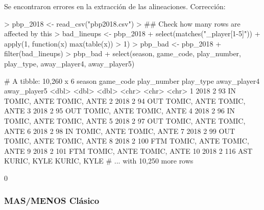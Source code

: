 \documentclass[paper=a4, fontsize=9pt]{article}
\begin{document}
Se encontraron errores en la extracción de las alineaciones. Corrección:

\begin{Schunk}
\begin{Sinput}
> pbp_2018 <- read_csv("pbp2018.csv")
> ## Check how many rows are affected by this
> bad_lineups <- pbp_2018 %
+   select(matches("_player[1-5]")) %
+   apply(1, function(x) max(table(x)) > 1)
> pbp_bad <- pbp_2018 %
+   filter(bad_lineups)
> pbp_bad %
+   select(season, game_code, play_number, play_type, away_player4, away_player5)
\end{Sinput}
\begin{Soutput}
# A tibble: 10,260 x 6
   season game_code play_number play_type away_player4 away_player5
    <dbl>     <dbl>       <dbl> <chr>     <chr>        <chr>       
 1   2018         2          93 IN        TOMIC, ANTE  TOMIC, ANTE 
 2   2018         2          94 OUT       TOMIC, ANTE  TOMIC, ANTE 
 3   2018         2          95 OUT       TOMIC, ANTE  TOMIC, ANTE 
 4   2018         2          96 IN        TOMIC, ANTE  TOMIC, ANTE 
 5   2018         2          97 OUT       TOMIC, ANTE  TOMIC, ANTE 
 6   2018         2          98 IN        TOMIC, ANTE  TOMIC, ANTE 
 7   2018         2          99 OUT       TOMIC, ANTE  TOMIC, ANTE 
 8   2018         2         100 FTM       TOMIC, ANTE  TOMIC, ANTE 
 9   2018         2         101 FTM       TOMIC, ANTE  TOMIC, ANTE 
10   2018         2         116 AST       KURIC, KYLE  KURIC, KYLE 
# ... with 10,250 more rows
\end{Soutput}
\begin{Soutput}
[1] 0
\end{Soutput}
\end{Schunk}

\subsubsection{MAS/MENOS Clásico}
    
\end{document}
